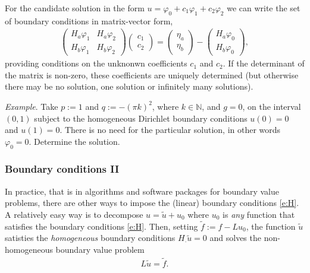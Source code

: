 \documentclass[12pt,a4paper]{article}
\newcommand{\IN}{\mathbb{N}}
\begin{document}
    For the candidate solution in the form
    $u = \varphi_0 + c_1 \varphi_1 + c_2 \varphi_2$
    we can write the set of 
    boundary conditions in matrix-vector form,
    \begin{align}
        \begin{pmatrix}
            H_a \varphi_1 & H_a \varphi_2
            \\
            H_b \varphi_1 & H_b \varphi_2
        \end{pmatrix}
        \begin{pmatrix}
            c_1 \\ c_2
        \end{pmatrix}
        =
        \begin{pmatrix}
            \eta_a \\ \eta_b
        \end{pmatrix}
        -
        \begin{pmatrix}
            H_a \varphi_0 \\ H_b \varphi_0
        \end{pmatrix}
        ,
    \end{align}
    providing conditions 
    on the unknonwn coefficients $c_1$ and $c_2$.
    If the determinant of the matrix is non-zero,
    these coefficients are uniquely determined
    (but otherwise there may be no solution, one solution or infinitely many solutions).
    
    
    \emph{Example}.
    Take 
    $p := 1$ and $q := -(\pi k)^2$,
    where $k \in \IN$,
    and $g = 0$,
    on the interval $(0, 1)$
    subject to 
    the homogeneous Dirichlet boundary conditions
    $u(0) = 0$
    and
    $u(1) = 0$.
    There is no need for the particular solution,
    in other words $\varphi_0 = 0$.
    Determine the solution.
    
    
    
    \subsubsection*{Boundary conditions II}
    
    In practice,
    that is in algorithms and software packages
    for boundary value problems,
    there are other ways to impose 
    the (linear) boundary conditions \eqref{e:H}.
    A relatively easy way is to 
    decompose $u = \tilde{u} + u_0$
    where
    $u_0$ is
    \emph{any} function that satisfies
    the boundary conditions \eqref{e:H}.
    Then,
    setting 
    $\tilde{f} := f - L u_0$,
    the function $\tilde{u}$
    satisties
    the \emph{homogeneous} boundary conditions
    $H_{\cdot} \tilde{u} = 0$
    and
    solves
    the non-homogeneous boundary value problem
    \begin{align}
        L \tilde{u} = \tilde{f}
        .
    \end{align}
    
\end{document}
